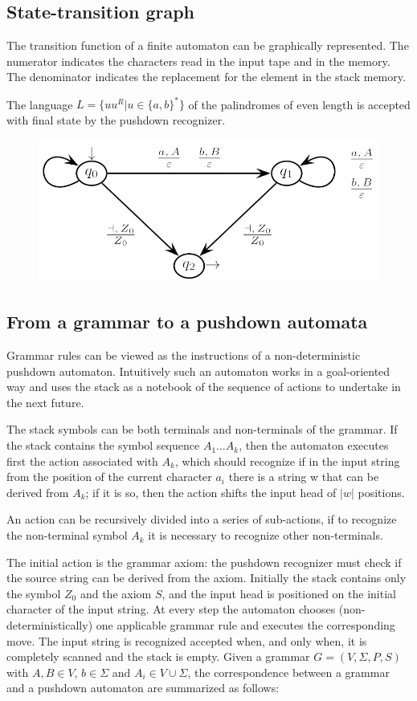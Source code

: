 \subsection*{State-transition graph}
The transition function of a finite automaton can be graphically represented.
The numerator indicates the characters read in the input tape and in the memory. 
The denominator indicates the replacement for the element in the stack memory. 
\begin{example}
    The language $L=\{uu^R|u \in \{a,b\}^{*}\}$ of the palindromes of even length is accepted with final state by the pushdown recognizer. 
    \begin{figure}[H]
        \centering
        \includegraphics[width=0.5\linewidth]{images/pda.png}
    \end{figure}
\end{example}

\subsection*{From a grammar to a pushdown automata}
Grammar rules can be viewed as the instructions of a non-deterministic pushdown automaton. 
Intuitively such an automaton works in a goal-oriented way and uses the stack as a notebook of the sequence of actions to undertake in the next future. 

The stack symbols can be both terminals and non-terminals of the grammar. 
If the stack contains the symbol sequence $A_1 \dots A_k$, then the automaton executes first the action associated with $A_k$, which should recognize if in the input string from the position of the current character $a_i$ there is a string w that can be derived from $A_k$; if it is so, then the action shifts the input head of $\left\lvert w\right\rvert $ positions. 

An action can be recursively divided into a series of sub-actions, if to recognize the non-terminal symbol $A_k$ it is necessary to recognize other non-terminals. 

The initial action is the grammar axiom: the pushdown recognizer must check if the source string can be derived from the axiom. 
Initially the stack contains only the symbol $Z_0$ and the axiom $S$, and the input head is positioned on the initial character of the input string. At every step the automaton chooses (non-deterministically) one applicable grammar rule and executes the corresponding move. 
The input string is recognized accepted when, and only when, it is completely scanned and the stack is empty. 
Given a grammar $G=(V,\Sigma,P,S)$ with $A,B \in V$, $b \in \Sigma$ and $A_i \in V \cup \Sigma$, the correspondence between a grammar and a pushdown automaton are summarized as follows: 

